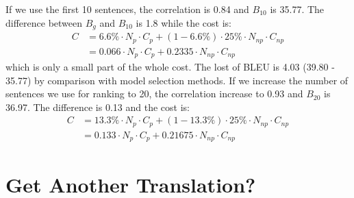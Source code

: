 \documentclass[11pt]{article}
\begin{document}
  If we use the first 10 sentences,  the correlation is 0.84 and  $B_{10}$ is 35.77. The difference between $B_{g}$ and $B_{10}$ is 1.8 while the cost is: \\
  \begin{align*}
  C& = 6.6\% \cdot N_{p}\cdot C_{p}  + (1-6.6\% )\cdot 25\% \cdot N_{np} \cdot C_{np}\\
   & = 0.066 \cdot N_{p}\cdot C_{p}  + 0.2335 \cdot N_{np} \cdot C_{np}
  \end{align*}
    which is only a small part of the whole cost. The lost of BLEU is 4.03 (39.80 - 35.77) by comparison with model selection methods.  If we increase the number of sentences we use for ranking to 20, the correlation increase to 0.93 and $B_{20}$ is 36.97. The difference is 0.13 and the cost is:
\begin{align*}
C& = 13.3\% \cdot N_{p}\cdot C_{p}  + (1-13.3\% )\cdot 25\% \cdot N_{np} \cdot C_{np}\\
   & = 0.133 \cdot N_{p}\cdot C_{p}  + 0.21675 \cdot N_{np} \cdot C_{np}
\end{align*}

    
     
%
%
%




 
 \section{Get Another Translation?}
 
 
\end{document}
